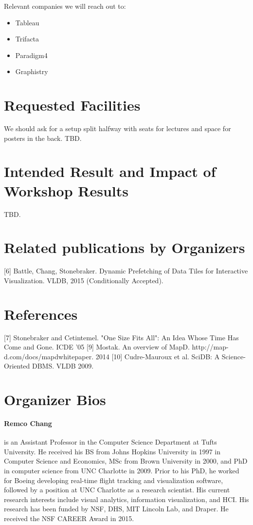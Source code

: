 \documentclass[journal]{vgtc}                %
\begin{document}
Relevant companies we will reach out to:
\begin{itemize}
\item Tableau
\item Trifacta
\item Paradigm4
\item Graphistry
\end{itemize}

\section{Requested Facilities}

We should ask for a setup split halfway with seats for lectures and space for posters in the back. TBD.

\section{Intended Result and Impact of Workshop Results}

TBD.

\section{Related publications by Organizers}
\cite{Battle:2013:DRO, Lins:2013:NFR, Liu:2013:IRT, Fisher:2012:TMI, Kandel:2012:PIS}
[6] Battle, Chang, Stonebraker. Dynamic Prefetching of Data Tiles for Interactive Visualization. VLDB, 2015 (Conditionally Accepted).

\section{References}

\cite{Agarwal:2013:BQW}

[7] Stonebraker and Cetintemel. "One Size Fits All": An Idea Whose Time Has Come and Gone. ICDE '05
[9] Mostak. An overview of MapD. http://map-d.com/docs/mapdwhitepaper. 2014
[10] Cudre-Mauroux et al. SciDB: A Science-Oriented DBMS. VLDB 2009.

\section{Organizer Bios}

\paragraph*{Remco Chang} is an Assistant Professor in the Computer Science Department at Tufts University. He received his BS from Johns Hopkins University in 1997 in Computer Science and Economics, MSc from Brown University in 2000, and PhD in computer science from UNC Charlotte in 2009. Prior to his PhD, he worked for Boeing developing real-time flight tracking and visualization software, followed by a position at UNC Charlotte as a research scientist. His current research interests include visual analytics, information visualization, and HCI. His research has been funded by NSF, DHS, MIT Lincoln Lab, and Draper. He received the NSF CAREER Award in 2015.
\end{document}
